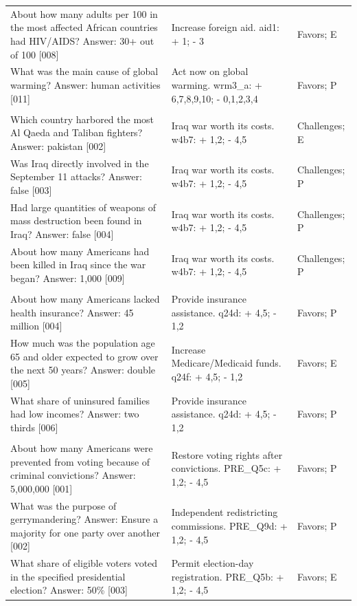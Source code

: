 \begin{longtable}{>{\raggedright\arraybackslash}p{8cm}>{\raggedright\arraybackslash}p{4cm}>{\raggedright\arraybackslash}p{2cm}}
About how many adults per 100 in the most affected African countries had HIV/AIDS? Answer: 30+ out of 100 [008] & Increase foreign aid. aid1: + 1; - 3 & Favors; E \\
What was the main cause of global warming? Answer: human activities [011] & Act now on global warming. wrm3\_a: + 6,7,8,9,10; - 0,1,2,3,4 & Favors; P \\
\addlinespace
\multicolumn{3}{l}{\textbf{US: election (2004)}} \\*
Which country harbored the most Al Qaeda and Taliban fighters? Answer: pakistan [002] & Iraq war worth its costs. w4b7: + 1,2; - 4,5 & Challenges; E \\
Was Iraq directly involved in the September 11 attacks? Answer: false [003] & Iraq war worth its costs. w4b7: + 1,2; - 4,5 & Challenges; P \\
Had large quantities of weapons of mass destruction been found in Iraq? Answer: false [004] & Iraq war worth its costs. w4b7: + 1,2; - 4,5 & Challenges; P \\
About how many Americans had been killed in Iraq since the war began? Answer: 1,000 [009] & Iraq war worth its costs. w4b7: + 1,2; - 4,5 & Challenges; P \\
\addlinespace
\multicolumn{3}{l}{\textbf{US: health/education (2005)}} \\*
About how many Americans lacked health insurance? Answer: 45 million [004] & Provide insurance assistance. q24d: + 4,5; - 1,2 & Favors; P \\
How much was the population age 65 and older expected to grow over the next 50 years? Answer: double [005] & Increase Medicare/Medicaid funds. q24f: + 4,5; - 1,2 & Favors; E \\
What share of uninsured families had low incomes? Answer: two thirds [006] & Provide insurance assistance. q24d: + 4,5; - 1,2 & Favors; P \\
\addlinespace
\multicolumn{3}{l}{\textbf{US: citizenship (2007)}} \\*
About how many Americans were prevented from voting because of criminal convictions? Answer: 5,000,000 [001] & Restore voting rights after convictions. PRE\_Q5c: + 1,2; - 4,5 & Favors; P \\
What was the purpose of gerrymandering? Answer: Ensure a majority for one party over another [002] & Independent redistricting commissions. PRE\_Q9d: + 1,2; - 4,5 & Favors; P \\
What share of eligible voters voted in the specified presidential election? Answer: 50\% [003] & Permit election-day registration. PRE\_Q5b: + 1,2; - 4,5 & Favors; E \\

\end{longtable}
